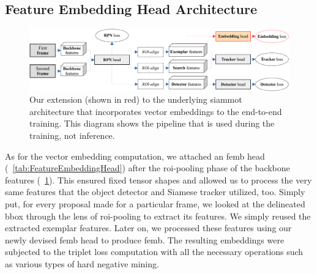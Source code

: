 \subsection{Feature Embedding Head Architecture}

\begin{figure}[!t]
    \centering
    \includegraphics[width=\linewidth]{figures/siamese_tracking/siammot_feature_emb_training.pdf}
    \caption[Embedding-enhanced \gls{siammot} architecture]{Our extension (shown in red) to the underlying \gls{siammot} architecture that incorporates vector embeddings to the end-to-end training. This diagram shows the pipeline that is used during the training, not inference.}
    \label{fig:SiamMOTWithEmbeddings}
\end{figure}

As for the vector embedding computation, we attached an \gls{femb} head (\tabletext{}~\ref{tab:FeatureEmbeddingHead}) after the \gls{roi}-pooling phase of the backbone features (\figtext{}~\ref{fig:SiamMOTWithEmbeddings}). This ensured fixed tensor shapes and allowed us to process the very same features that the object detector and Siamese tracker utilized, too. Simply put, for every proposal made for a particular frame, we looked at the delineated \gls{bbox} through the lens of \gls{roi}-pooling to extract its features. We simply reused the extracted exemplar features. Later on, we processed these features using our newly devised \gls{femb} head to produce \gls{femb}. The resulting embeddings were subjected to the triplet loss computation with all the necessary operations such as various types of hard negative mining.

